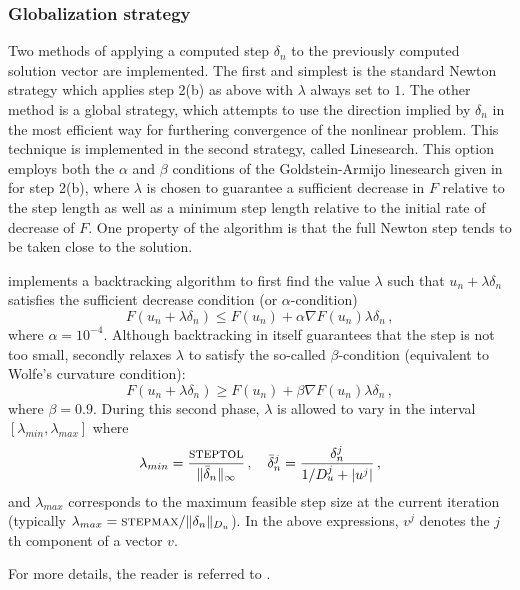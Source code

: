 
\subsubsection*{Globalization strategy}
Two methods of applying a computed step $\delta_n$ to the
previously computed solution vector are implemented. The first and
simplest is the standard Newton strategy which applies step 2(b) as
above with $\lambda$ always set to $1$. The other method is a
global strategy, which attempts to use the direction implied by
$\delta_n$ in the most efficient way for furthering convergence of
the nonlinear problem. This technique is implemented in the second
strategy, called Linesearch.  This option employs both the
$\alpha$ and $\beta$ conditions of the Goldstein-Armijo linesearch
given in \cite{DeSc:96} for step 2(b), where $\lambda$ is chosen
to guarantee a sufficient decrease in $F$ relative to the step
length as well as a minimum step length relative to the initial
rate of decrease of $F$.  One property of the algorithm is that
the full Newton step tends to be taken close to the solution.  

{\kinsol} implements a backtracking algorithm to first find
the value $\lambda$ such that $u_n + \lambda \delta_n$
satisfies the sufficient decrease condition (or $\alpha$-condition)
\[
F(u_n + \lambda\delta_n) \le F(u_n) + \alpha \nabla F(u_n) \lambda\delta_n \, ,
\]
where $\alpha = 10^{-4}$.
Although backtracking in itself guarantees that the step is not too small,
{\kinsol} secondly relaxes $\lambda$ to satisfy the so-called $\beta$-condition
(equivalent to Wolfe's curvature condition):
\[
F(u_n + \lambda\delta_n) \ge F(u_n) + \beta \nabla F(u_n) \lambda\delta_n \, ,
\]
where $\beta = 0.9$. During this second phase, $\lambda$ is allowed to
vary in the interval $[\lambda_{min} , \lambda_{max}]$ where
\[
\lambda_{min} =  \frac{\mbox{\sc steptol}}{\| \bar\delta_n\|_{\infty}} \, , \quad
\bar\delta_n^j = \frac{\delta_n^j}{1/D_u^j + |u^j|} \, ,
\]
and $\lambda_{max}$ corresponds to the maximum feasible step size at the
current iteration (typically $\lambda_{max} = \mbox{\sc stepmax} / \|\delta_n\|_{D_u}$).
In the above expressions, $v^j$ denotes the $j$th component of a vector $v$.

For more details, the reader is referred to \cite{DeSc:96}.


